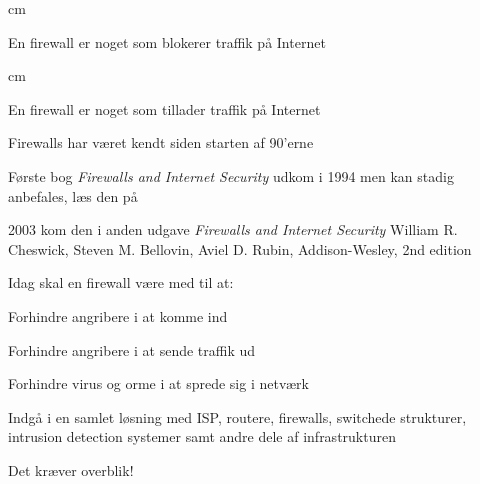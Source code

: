 \documentclass[Screen16to9,17pt]{foils}
\begin{document}
 cm
\centerline{\hlkbig En firewall er noget som {\color{security6blue}blokerer}
  traffik på Internet}

 cm
\pause

\centerline{\hlkbig En firewall er noget som {\color{red}tillader}
  traffik på Internet}



\begin{list1}
\item Firewalls har været kendt siden starten af 90'erne
\item Første bog \emph{Firewalls and Internet Security} udkom i 1994 men kan stadig anbefales, læs den på 
\item 2003 kom den i anden udgave \emph{Firewalls and Internet Security}
William R. Cheswick, Steven M. Bellovin, Aviel D. Rubin,
Addison-Wesley, 2nd edition
\end{list1}




\begin{list1}
\item Idag skal en firewall være med til at:
\begin{list2}
\item Forhindre angribere i at komme ind
\item Forhindre angribere i at sende traffik ud
\item Forhindre virus og orme i at sprede sig i netværk
\item Indgå i en samlet løsning med ISP, routere, firewalls, switchede
  strukturer,\\
  intrusion detection systemer samt andre dele af infrastrukturen
\end{list2}
\item Det kræver overblik!
\end{list1}



\end{document}
